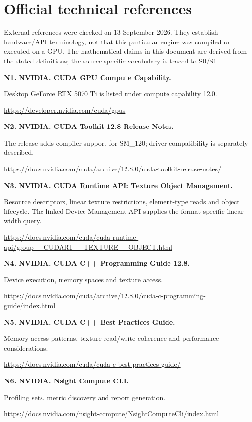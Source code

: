 \documentclass[11pt,a4paper]{article}
\begin{document}
\section*{Official technical references}
External references were checked on 13 September 2026. They establish hardware/API terminology, not that this particular engine was compiled or executed on a GPU. The mathematical claims in this document are derived from the stated definitions; the source-specific vocabulary is traced to S0/S1.

\small
\textbf{N1. NVIDIA. CUDA GPU Compute Capability.}\par
Desktop GeForce RTX 5070 Ti is listed under compute capability 12.0.\par
\url{https://developer.nvidia.com/cuda/gpus}

\textbf{N2. NVIDIA. CUDA Toolkit 12.8 Release Notes.}\par
The release adds compiler support for SM\_120; driver compatibility is separately described.\par
\url{https://docs.nvidia.com/cuda/archive/12.8.0/cuda-toolkit-release-notes/}

\textbf{N3. NVIDIA. CUDA Runtime API: Texture Object Management.}\par
Resource descriptors, linear texture restrictions, element-type reads and object lifecycle. The linked Device Management API supplies the format-specific linear-width query.\par
\url{https://docs.nvidia.com/cuda/cuda-runtime-api/group__CUDART__TEXTURE__OBJECT.html}

\textbf{N4. NVIDIA. CUDA C++ Programming Guide 12.8.}\par
Device execution, memory spaces and texture access.\par
\url{https://docs.nvidia.com/cuda/archive/12.8.0/cuda-c-programming-guide/index.html}

\textbf{N5. NVIDIA. CUDA C++ Best Practices Guide.}\par
Memory-access patterns, texture read/write coherence and performance considerations.\par
\url{https://docs.nvidia.com/cuda/cuda-c-best-practices-guide/}

\textbf{N6. NVIDIA. Nsight Compute CLI.}\par
Profiling sets, metric discovery and report generation.\par
\url{https://docs.nvidia.com/nsight-compute/NsightComputeCli/index.html}
\end{document}
